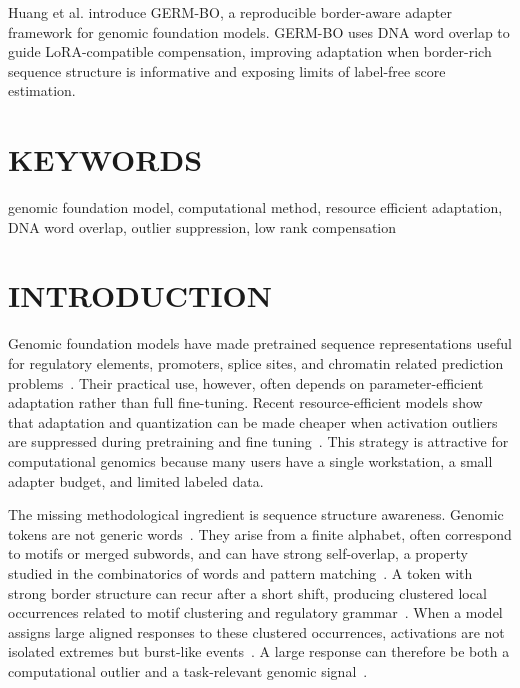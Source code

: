 \documentclass[12pt,letterpaper]{article}
\begin{document}
Huang et al. introduce GERM-BO, a reproducible border-aware adapter framework for genomic foundation models. GERM-BO uses DNA word overlap to guide LoRA-compatible compensation, improving adaptation when border-rich sequence structure is informative and exposing limits of label-free score estimation.

\section*{KEYWORDS}

genomic foundation model, computational method, resource efficient adaptation, DNA word overlap, outlier suppression, low rank compensation

\section*{INTRODUCTION}

Genomic foundation models have made pretrained sequence representations useful for regulatory elements, promoters, splice sites, and chromatin related prediction problems~\cite{dnabert2021,dnabert22023,nucleotidetransformer2024,hyenadna2024,jaganathan2019spliceai}. Their practical use, however, often depends on parameter-efficient adaptation rather than full fine-tuning. Recent resource-efficient models show that adaptation and quantization can be made cheaper when activation outliers are suppressed during pretraining and fine tuning~\cite{germ2025,dettmers2022llm,int8outlier2022,lian2024medpeft}. This strategy is attractive for computational genomics because many users have a single workstation, a small adapter budget, and limited labeled data.

The missing methodological ingredient is sequence structure awareness. Genomic tokens are not generic words~\cite{lindsey2025impact}. They arise from a finite alphabet, often correspond to motifs or merged subwords, and can have strong self-overlap, a property studied in the combinatorics of words and pattern matching~\cite{guibas1981string,Dai2011}. A token with strong border structure can recur after a short shift, producing clustered local occurrences related to motif clustering and regulatory grammar~\cite{encode2012integrated,zhou2015predicting}. When a model assigns large aligned responses to these clustered occurrences, activations are not isolated extremes but burst-like events~\cite{bondarenko2021understanding,aldous1989poisson,dettmers2022llm}. A large response can therefore be both a computational outlier and a task-relevant genomic signal~\cite{Kinney2010}.
\end{document}
